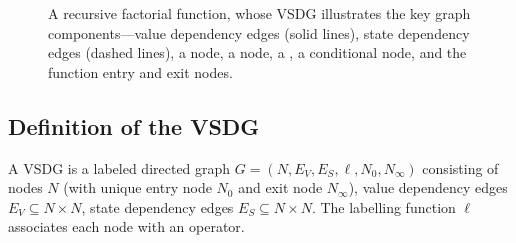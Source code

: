 {\begin{figure}[!htb]

  \centering
  \subfloat[VSDG]{\label{fig:fac-vsdg}
    \begin{minipage}[b]{.6\linewidth}
    \useheightbox{}
  \end{minipage}
}
\caption{A recursive factorial function, whose VSDG illustrates the key graph components---value dependency edges (solid lines), state dependency edges (dashed lines), a  node, a  node, a \Gn, a conditional node, and the function entry and exit nodes.}
\label{fig:fac}
\end{figure}


\subsection{Definition of the VSDG}

A VSDG is a labeled directed graph $G=(N,E_V,E_S,\ell,N_0,N_\infty)$ consisting of nodes $N$ (with unique entry node $N_0$ and exit node $N_\infty$), value dependency edges $E_V \subseteq N \times N$, state dependency edges $E_S \subseteq N \times N$. 
The labelling function $\ell$ associates each node with an operator.

}
